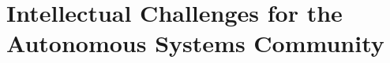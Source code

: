 \documentclass[sigconf,nonacm]{acmart}%
\begin{document}

	\section{Intellectual Challenges for the Autonomous Systems Community}\label{as-challenges}
\end{document}
